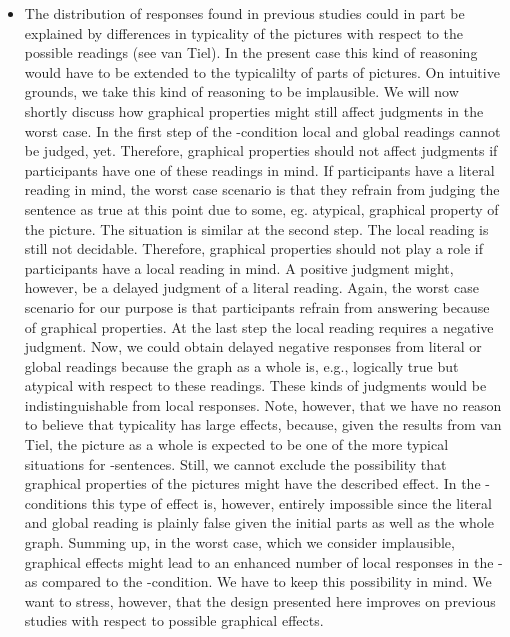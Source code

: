 \documentclass[fleqn,reqno,10pt,draft]{article}
\newcommand{\as}{\acro{as}}
\renewcommand{\es}{\acro{es}}
\begin{document}
\begin{itemize}
\item The distribution of
responses found in previous studies could in part be explained by
differences in typicality of the pictures with respect to the possible
readings (see van Tiel). In the present case this kind of reasoning
would have to be extended to the typicalilty of parts of pictures. On
intuitive grounds, we take this kind of reasoning to be
implausible. We will now shortly discuss how graphical properties
might still affect judgments in the worst case. In the first step of
the \as-condition local and global readings cannot be judged,
yet. Therefore, graphical properties should not affect judgments if
participants have one of these readings in mind. If participants have
a literal reading in mind, the worst case scenario is that they
refrain from judging the sentence as true at this point due to some,
eg. atypical, graphical property of the picture. The situation is
similar at the second step. The local reading is still not
decidable. Therefore, graphical properties should not play a role if
participants have a local reading in mind. A positive judgment might,
however, be a delayed judgment of a literal reading. Again, the worst
case scenario for our purpose is that participants refrain from
answering because of graphical properties. At the last step the local
reading requires a negative judgment. Now, we could obtain delayed
negative responses from literal or global readings because the graph
as a whole is, e.g., logically true but atypical with respect to these
readings. These kinds of judgments would be indistinguishable from
local responses. Note, however, that we have no reason to believe that
typicality has large effects, because, given the results from van
Tiel, the picture as a whole is expected to be one of the more typical
situations for \as-sentences. Still, we cannot exclude the possibility
that graphical properties of the pictures might have the described
effect. In the \es-conditions this type of effect is, however,
entirely impossible since the literal and global reading is plainly
false given the initial parts as well as the whole graph. Summing up,
in the worst case, which we consider implausible, graphical effects
might lead to an enhanced number of local responses in the \as- as
compared to the \es-condition. We have to keep this possibility in
mind. We want to stress, however, that the design presented here
improves on previous studies with respect to possible graphical
effects.
\end{itemize}
\end{document}

